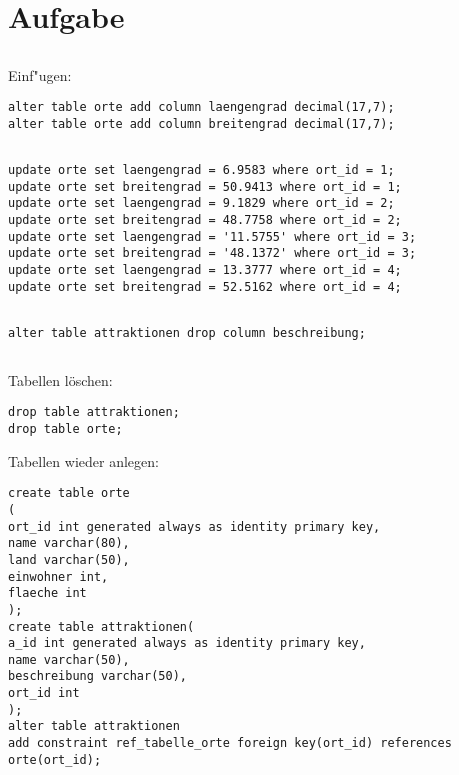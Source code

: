 \documentclass[a4paper,11pt,titlepage]{article}
\begin{document}
\section{Aufgabe}
\subsection{}
Einf"ugen:\\
\begin{verbatim}
alter table orte add column laengengrad decimal(17,7);
alter table orte add column breitengrad decimal(17,7);
\end{verbatim}
\subsection{}
\begin{verbatim}
update orte set laengengrad = 6.9583 where ort_id = 1;
update orte set breitengrad = 50.9413 where ort_id = 1;
update orte set laengengrad = 9.1829 where ort_id = 2;
update orte set breitengrad = 48.7758 where ort_id = 2;
update orte set laengengrad = '11.5755' where ort_id = 3;
update orte set breitengrad = '48.1372' where ort_id = 3;
update orte set laengengrad = 13.3777 where ort_id = 4;
update orte set breitengrad = 52.5162 where ort_id = 4;
\end{verbatim}
\subsection{}
\begin{verbatim}
alter table attraktionen drop column beschreibung;
\end{verbatim}
\subsection{}
Tabellen löschen:
\begin{verbatim}
drop table attraktionen;
drop table orte;
\end{verbatim}
Tabellen wieder anlegen:
\begin{verbatim}
create table orte 
(
ort_id int generated always as identity primary key,
name varchar(80),
land varchar(50),
einwohner int,
flaeche int
);
create table attraktionen(
a_id int generated always as identity primary key,
name varchar(50),
beschreibung varchar(50),
ort_id int
);
alter table attraktionen 
add constraint ref_tabelle_orte foreign key(ort_id) references orte(ort_id);

\end{verbatim}
\end{document}
